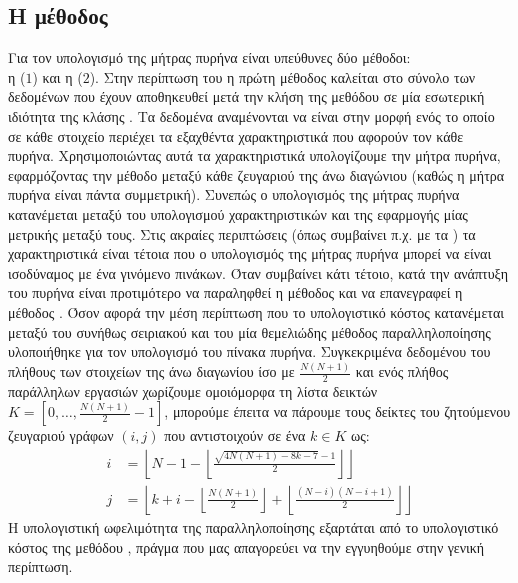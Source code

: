 \subsection{Η μέθοδος \texttt{}}
Για τον υπολογισμό της μήτρας πυρήνα είναι υπεύθυνες δύο μέθοδοι:\\ η \texttt{} ($1$) και  η \texttt{} ($2$).
Στην περίπτωση του \texttt{} η πρώτη μέθοδος καλείται στο σύνολο των δεδομένων που έχουν αποθηκευθεί μετά την κλήση της μεθόδου \texttt{} σε μία εσωτερική ιδιότητα της κλάσης \texttt{}.
Τα δεδομένα αναμένονται να είναι στην μορφή ενός \texttt{} το οποίο σε κάθε στοιχείο περιέχει τα εξαχθέντα χαρακτηριστικά που αφορούν τον κάθε πυρήνα.
Χρησιμοποιώντας αυτά τα χαρακτηριστικά υπολογίζουμε την μήτρα πυρήνα, εφαρμόζοντας την μέθοδο \texttt{} μεταξύ κάθε ζευγαριού της άνω διαγώνιου (καθώς η μήτρα πυρήνα είναι πάντα συμμετρική).
Συνεπώς ο υπολογισμός της μήτρας πυρήνα κατανέμεται μεταξύ του υπολογισμού χαρακτηριστικών και της εφαρμογής μίας μετρικής μεταξύ τους.
Στις ακραίες περιπτώσεις (όπως συμβαίνει π.χ. με τα ) τα χαρακτηριστικά είναι τέτοια που ο υπολογισμός της μήτρας πυρήνα μπορεί να είναι ισοδύναμος με ένα γινόμενο πινάκων.
Όταν συμβαίνει κάτι τέτοιο, κατά την ανάπτυξη του πυρήνα είναι προτιμότερο να παραληφθεί η μέθοδος \texttt{} και να επανεγραφεί η μέθοδος \texttt{}.
Όσον αφορά την μέση περίπτωση που το υπολογιστικό κόστος κατανέμεται μεταξύ του συνήθως σειριακού \texttt{} και του \texttt{} μία θεμελιώδης μέθοδος παραλληλοποίησης υλοποιήθηκε για τον υπολογισμό του πίνακα πυρήνα.
Συγκεκριμένα δεδομένου του πλήθους των στοιχείων της άνω διαγωνίου ίσο με $\frac{N(N+1)}{2}$ και ενός πλήθος παράλληλων εργασιών \texttt{} χωρίζουμε ομοιόμορφα τη λίστα δεικτών $K = [0, \dots, \frac{N(N+1)}{2}-1]$, μπορούμε έπειτα να πάρουμε τους δείκτες του ζητούμενου ζευγαριού γράφων $(i,j)$ που αντιστοιχούν σε ένα $k \in K$ ως:
\begin{align}
    i &= \left\lfloor N - 1 - \left\lfloor \frac{\sqrt{4N(N+1) - 8k - 7} - 1}{2}\right\rfloor \right\rfloor\\
    j &= \left\lfloor k + i - \left\lfloor \frac{N(N+1)}{2} \right\rfloor + \left\lfloor \frac{(N-i)(N-i+1)}{2} \right\rfloor \right\rfloor
\end{align}
Η υπολογιστική ωφελιμότητα της παραλληλοποίησης εξαρτάται από το υπολογιστικό κόστος της μεθόδου \texttt{}, πράγμα που μας απαγορεύει να την εγγυηθούμε στην γενική περίπτωση.

